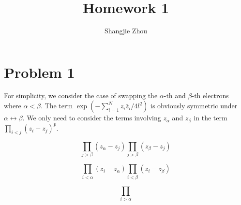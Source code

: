 \documentclass{article}
\title{Homework 1}
\author{Shangjie Zhou}
\begin{document}
\maketitle


\section{Problem 1}
For simplicity, we consider the case of swapping the $\alpha$-th and $\beta$-th electrons where $\alpha<\beta$.
The term $\exp(-\sum_{i=1}^Nz_i \bar{z}_i/4l^2)$ is obviously symmetric under $\alpha\leftrightarrow \beta$.
We only need to consider the terms involving $z_\alpha$ and $z_\beta$ in the term $\prod_{i<j}(z_i-z_j)^p$.

\begin{equation}
    \prod_{j>\beta}(z_\alpha-z_j)\prod_{j>\beta}(z_\beta-z_j)
\end{equation}

\begin{equation}
    \prod_{i<\alpha}(z_i-z_\alpha)\prod_{i<\beta}(z_i-z_\beta)
\end{equation}

\begin{equation}
    \prod_{i>\alpha}
\end{equation}


%
%
\end{document}
